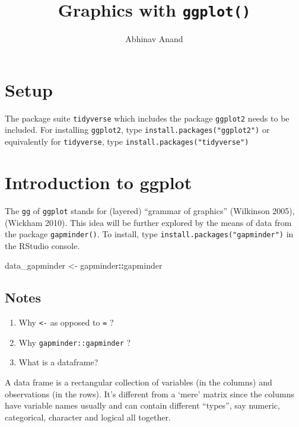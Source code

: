 \documentclass[11pt,]{article}
\title{Graphics with \texttt{ggplot()}}
\author{Abhinav Anand}
\date{}
\newenvironment{Shaded}{\begin{snugshade}}{\end{snugshade}}
\newcommand{\StringTok}[1]{\textcolor[rgb]{0.31,0.60,0.02}{#1}}
\newcommand{\OperatorTok}[1]{\textcolor[rgb]{0.81,0.36,0.00}{\textbf{#1}}}
\newcommand{\NormalTok}[1]{#1}
\begin{document}
\maketitle

\section{Setup}\label{setup}

The package suite \texttt{tidyverse} which includes the package
\texttt{ggplot2} needs to be included. For installing \texttt{ggplot2},
type \texttt{install.packages("ggplot2")} or equivalently for
\texttt{tidyverse}, type \texttt{install.packages("tidyverse")}

\section{Introduction to ggplot}\label{introduction-to-ggplot}

The \texttt{gg} of \texttt{ggplot} stands for (layered) ``grammar of
graphics'' (Wilkinson 2005), (Wickham 2010). This idea will be further
explored by the means of data from the package \texttt{gapminder()}. To
install, type \texttt{install.packages("gapminder")} in the RStudio
console.

\begin{Shaded}
\begin{Highlighting}[]
\NormalTok{data_gapminder <-}\StringTok{ }\NormalTok{gapminder}\OperatorTok{::}\NormalTok{gapminder }
\end{Highlighting}
\end{Shaded}

\subsection{Notes}\label{notes}

\begin{enumerate}
\def\labelenumi{\arabic{enumi}.}
\item
  Why \texttt{\textless{}-} as opposed to \texttt{=} ?
\item
  Why \texttt{gapminder::gapminder} ?
\item
  What is a dataframe?
\end{enumerate}

A data frame is a rectangular collection of variables (in the columns)
and observations (in the rows). It's different from a `mere' matrix
since the columns have variable names usually and can contain different
``types'', say numeric, categorical, character and logical all together.
\end{document}
